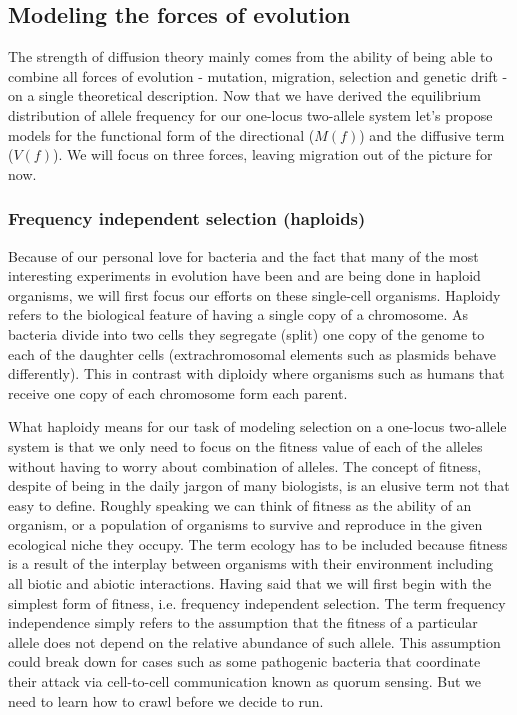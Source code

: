 \subsection{Modeling the forces of evolution}

The strength of diffusion theory mainly comes from the ability of being able to
combine all forces of evolution - mutation, migration, selection and genetic
drift - on a single theoretical description. Now that we have derived the
equilibrium distribution of allele frequency for our one-locus two-allele system
let's propose models for the functional form of the directional ($M(f)$) and the
diffusive term ($V(f)$). We will focus on three forces, leaving migration out of
the picture for now.

\subsubsection{Frequency independent selection (haploids)}

Because of our personal love for bacteria and the fact that many of the most
interesting experiments in evolution have been and are being done in haploid
organisms, we will first focus our efforts on these single-cell organisms.
Haploidy refers to the biological feature of having a single copy of a
chromosome. As bacteria divide into two cells they segregate (split) one copy of
the genome to each of the daughter cells (extrachromosomal elements such as
plasmids behave differently). This in contrast with diploidy where organisms
such as humans that receive one copy of each chromosome form each parent.

What haploidy means for our task of modeling selection on a one-locus two-allele
system is that we only need to focus on the fitness value of each of the alleles
without having to worry about combination of alleles. The concept of fitness,
despite of being in the daily jargon of many biologists, is an elusive term not
that easy to define. Roughly speaking we can think of fitness as the ability of
an organism, or a population of organisms to survive and reproduce in the given
ecological niche they occupy. The term ecology has to be included because
fitness is a result of the interplay between organisms with their environment
including all biotic and abiotic interactions. Having said that we will first
begin with the simplest form of fitness, i.e. frequency independent selection.
The term frequency independence simply refers to the assumption that the fitness
of a particular allele does not depend on the relative abundance of such allele.
This assumption could break down for cases such as some pathogenic bacteria that
coordinate their attack via cell-to-cell communication known as quorum sensing.
But we need to learn how to crawl before we decide to run.

